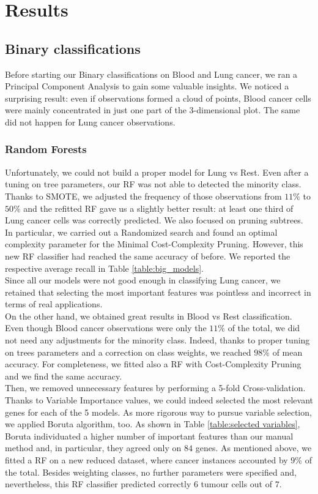 \documentclass[a4paper,11pt, oneside]{article}  %
\begin{document}
\section{Results}
\subsection{Binary classifications}
Before starting our Binary classifications on Blood and Lung cancer, we ran a Principal Component Analysis to gain some valuable insights. We noticed a surprising result: even if observations formed a cloud of points, Blood cancer cells were mainly concentrated in just one part of the 3-dimensional plot. The same did not happen for Lung cancer observations.

\subsubsection{Random Forests}
Unfortunately, we could not build a proper model for Lung vs Rest. Even after a tuning on tree parameters, our RF was not able to detected the minority class. Thanks to SMOTE, we adjusted the frequency of those observations from $11\%$ to $50\%$ and the refitted RF gave us a slightly better result: at least one third of Lung cancer cells was correctly predicted. We also focused on pruning subtrees. In particular, we carried out a Randomized search and found an optimal complexity parameter for the Minimal Cost-Complexity Pruning. However, this new RF classifier had reached the same accuracy of before. We reported the respective average recall in Table \ref{table:big_models}. \\
Since all our models were not good enough in classifying Lung cancer, we retained that selecting the most important features was pointless and incorrect in terms of real applications. \\
On the other hand, we obtained great results in Blood vs Rest classification. Even though Blood cancer observations were only the $11\%$ of the total, we did not need any adjustments for the minority class. Indeed, thanks to proper tuning on trees parameters and a correction on class weights, we reached $98\%$ of mean accuracy. For completeness, we fitted also a RF with Cost-Complexity Pruning and we find the same accuracy. \\
Then, we removed unnecessary features by performing a 5-fold Cross-validation. Thanks to Variable Importance values, we could indeed selected the most relevant genes for each of the 5 models. As more rigorous way to pursue variable selection, we applied Boruta algorithm, too. As shown in Table \ref{table:selected variables}, Boruta individuated a higher number of important features than our manual method and, in particular, they agreed only on $84$ genes. As mentioned above, we fitted a RF on a new reduced dataset, where cancer instances accounted by $9\%$ of the total. Besides weighting classes, no further parameters were specified and, nevertheless, this RF classifier predicted correctly $6$ tumour cells out of $7$.   
\end{document}
